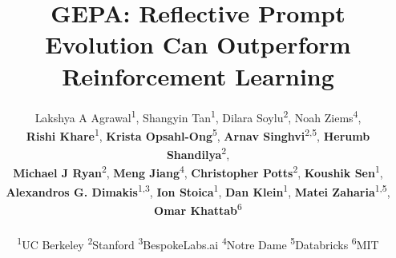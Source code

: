 \documentclass{article} %
\title{GEPA: Reflective Prompt Evolution Can Outperform Reinforcement Learning}
\author{
Lakshya A Agrawal\textsuperscript{1},
Shangyin Tan\textsuperscript{1},
Dilara Soylu\textsuperscript{2},
Noah Ziems\textsuperscript{4},\\
\textbf{Rishi Khare}\textsuperscript{1},
\textbf{Krista Opsahl-Ong}\textsuperscript{5},
\textbf{Arnav Singhvi}\textsuperscript{2,5},
\textbf{Herumb Shandilya}\textsuperscript{2},\\
\textbf{Michael J Ryan}\textsuperscript{2},
\textbf{Meng Jiang}\textsuperscript{4},
\textbf{Christopher Potts}\textsuperscript{2},
\textbf{Koushik Sen}\textsuperscript{1},\\
\textbf{Alexandros G. Dimakis}\textsuperscript{1,3},
\textbf{Ion Stoica}\textsuperscript{1},
\textbf{Dan Klein}\textsuperscript{1},
\textbf{Matei Zaharia}\textsuperscript{1,5},
\textbf{Omar Khattab}\textsuperscript{6} \\
\\
\textsuperscript{1}UC Berkeley \quad 
\textsuperscript{2}Stanford \quad 
\textsuperscript{3}BespokeLabs.ai \quad
\textsuperscript{4}Notre Dame \quad
\textsuperscript{5}Databricks \quad 
\textsuperscript{6}MIT
}
\begin{document}
\maketitle

\begin{abstract}
    

\end{abstract}
\end{document}
